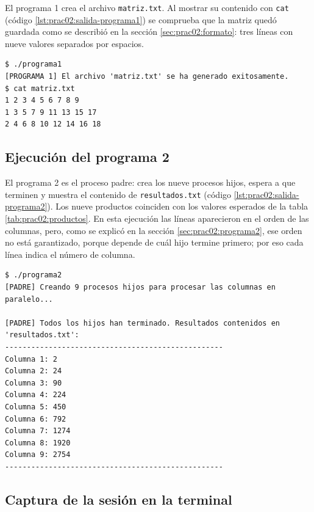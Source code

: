 El programa 1 crea el archivo \texttt{matriz.txt}. Al mostrar su contenido con \texttt{cat} (código \ref{lst:prac02:salida-programa1}) se comprueba que la matriz quedó guardada como se describió en la sección \ref{sec:prac02:formato}: tres líneas con nueve valores separados por espacios.

\begin{lstlisting}[numbers=none, language={}, caption={Ejecución del programa 1 y contenido de \texttt{matriz.txt}.}, label={lst:prac02:salida-programa1}]
$ ./programa1
[PROGRAMA 1] El archivo 'matriz.txt' se ha generado exitosamente.
$ cat matriz.txt
1 2 3 4 5 6 7 8 9
1 3 5 7 9 11 13 15 17
2 4 6 8 10 12 14 16 18
\end{lstlisting}

\subsection{Ejecución del programa 2}
\label{sec:prac02:evid-programa2}

El programa 2 es el proceso padre: crea los nueve procesos hijos, espera a que terminen y muestra el contenido de \texttt{resultados.txt} (código \ref{lst:prac02:salida-programa2}). Los nueve productos coinciden con los valores esperados de la tabla \ref{tab:prac02:productos}. En esta ejecución las líneas aparecieron en el orden de las columnas, pero, como se explicó en la sección \ref{sec:prac02:programa2}, ese orden no está garantizado, porque depende de cuál hijo termine primero; por eso cada línea indica el número de columna.

\begin{lstlisting}[numbers=none, language={}, caption={Ejecución del programa 2 (proceso padre y nueve procesos hijos).}, label={lst:prac02:salida-programa2}]
$ ./programa2
[PADRE] Creando 9 procesos hijos para procesar las columnas en paralelo...

[PADRE] Todos los hijos han terminado. Resultados contenidos en 'resultados.txt':
--------------------------------------------------
Columna 1: 2
Columna 2: 24
Columna 3: 90
Columna 4: 224
Columna 5: 450
Columna 6: 792
Columna 7: 1274
Columna 8: 1920
Columna 9: 2754
--------------------------------------------------
\end{lstlisting}

\subsection{Captura de la sesión en la terminal}
\label{sec:prac02:evid-captura}

